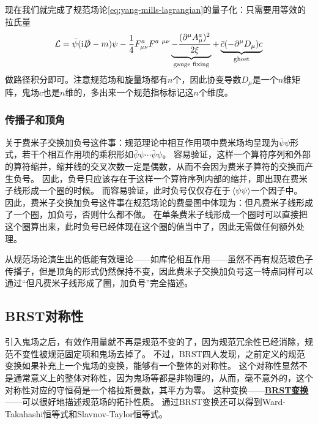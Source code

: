 \documentclass[hyperref, UTF8, a4paper]{ctexart}
\newcommand*{\ii}{\mathrm{i}}
\newcommand{\concept}[1]{\underline{\textbf{#1}}}
\begin{document}
现在我们就完成了规范场论\eqref{eq:yang-mills-lagrangian}的量子化：只需要用等效的拉氏量
\begin{equation}
    \mathcal{L} = \bar{\psi} (\ii \slashed{D} - m) \psi - \frac{1}{4} F_{\mu \nu}^a F^{a \ \mu \nu} \underbrace{- \frac{(\partial^\mu A_\mu^a)^2}{2 \xi}}_{\text{gauge fixing}} + \underbrace{\bar{c} (- \partial^\mu D_\mu) c}_{\text{ghost}}
\end{equation}
做路径积分即可。注意规范场和旋量场都有$n$个，因此协变导数$D_\mu$是一个$n$维矩阵，鬼场$c$也是$n$维的，多出来一个规范指标标记这$n$个维度。

\subsubsection{传播子和顶角}

关于费米子交换加负号这件事：规范理论中相互作用项中费米场均呈现为$\bar{\psi} \psi$形式，若干个相互作用项的乘积形如$\bar{\psi} \psi \cdots \bar{\psi} \psi$。
容易验证，这样一个算符序列和外部的算符缩并，缩并线的交叉次数一定是偶数，从而不会因为费米子算符的交换而产生负号。
因此，负号只应该存在于这样一个算符序列内部的缩并，即出现在费米子线形成一个圈的时候。
而容易验证，此时负号仅仅存在于$\expval*{\bar{\psi} \psi}$一个因子中。
因此，费米子交换加负号这件事在规范场论的费曼图中体现为：但凡费米子线形成了一个圈，加负号，否则什么都不做。
在单条费米子线形成一个圈时可以直接把这个圈算出来，此时负号已经体现在这个圈的值当中了，因此无需做任何额外处理。

从规范场论演生出的低能有效理论——如库伦相互作用——虽然不再有规范玻色子传播子，但是顶角的形式仍然保持不变，因此费米子交换加负号这一特点同样可以通过“但凡费米子线形成了圈，加负号”完全描述。

\subsection{BRST对称性}

引入鬼场之后，有效作用量就不再是规范不变的了，因为规范冗余性已经消除，规范不变性被规范固定项和鬼场去掉了。
不过，BRST四人发现，之前定义的规范变换如果补充上一个鬼场的变换，能够有一个整体的对称性。
这个对称性显然不是通常意义上的整体对称性，因为鬼场等都是非物理的，从而，毫不意外的，这个对称性对应的守恒荷是一个格拉斯曼数，其平方为零。
这种变换——\concept{BRST变换}——可以很好地描述规范场的拓扑性质。
通过BRST变换还可以得到Ward-Takahashi恒等式和Slavnov-Taylor恒等式。
\end{document}
